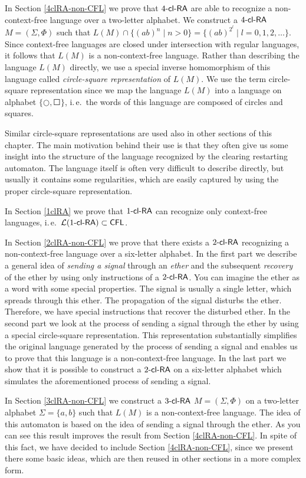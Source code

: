 In Section \ref{4clRA-non-CFL} we prove that $\kclRA[4]$ are able to recognize a non-context-free language over a two-letter alphabet. We construct a $\kclRA[4]$ $M = (\Sigma, \Phi)$ such that $L(M) \cap \{(ab)^n \mid n > 0\} = \{(ab)^{2^l} \mid l = 0, 1, 2, \ldots\}$. Since context-free languages are closed under intersection with regular languages, it follows that $L(M)$ is a non-context-free language. Rather than describing the language $L(M)$ directly, we use a special inverse homomorphism of this language called \emph{circle-square representation} of $L(M)$. We use the term circle-square representation since we map the language $L(M)$ into a language on alphabet $\{ \Circle, \Square \}$, i.\,e.\ the words of this language are composed of circles and squares.

Similar circle-square representations are used also in other sections of this chapter. The main motivation behind their use is that they often give us some insight into the structure of the language recognized by the clearing restarting automaton. The language itself is often very difficult to describe directly, but usually it contains some regularities, which are easily captured by using the proper circle-square representation.

In Section \ref{1clRA} we prove that $\kclRA[1]$ can recognize only context-free languages, i.\,e.\ $\calL{\kclRA[1]} \subset \CFL$.

In Section \ref{2clRA-non-CFL} we prove that there exists a $\kclRA[2]$ recognizing a non-context-free language over a six-letter alphabet. In the first part we describe a general idea of \emph{sending a signal} through an \emph{ether} and the subsequent \emph{recovery} of the ether by using only instructions of a $\kclRA[2]$. You can imagine the ether as a word with some special properties. The signal is usually a single letter, which spreads through this ether. The propagation of the signal disturbs the ether. Therefore, we have special instructions that recover the disturbed ether. In the second part we look at the process of sending a signal through the ether by using a special circle-square representation. This representation substantially simplifies the original language generated by the process of sending a signal and enables us to prove that this language is a non-context-free language. In the last part we show that it is possible to construct a $\kclRA[2]$ on a six-letter alphabet which simulates the aforementioned process of sending a signal.

In Section \ref{3clRA-non-CFL} we construct a $\kclRA[3]$ $M = (\Sigma, \Phi)$ on a two-letter alphabet $\Sigma = \{a, b\}$ such that $L(M)$ is a non-context-free language. The idea of this automaton is based on the idea of sending a signal through the ether. As you can see this result improves the result from Section \ref{4clRA-non-CFL}. In spite of this fact, we have decided to include Section \ref{4clRA-non-CFL}, since we present there some basic ideas, which are then reused in other sections in a more complex form.

